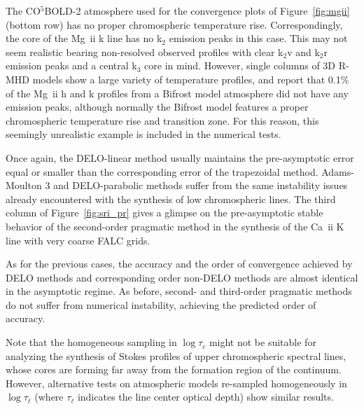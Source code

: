 \documentclass[iop,numberedappendix,twocolappendix,twocolumn]{emulateapj}
\begin{document}
The CO$^5$BOLD-2 atmosphere used for the convergence plots of Figure~\ref{fig:mgii} (bottom row) has
no proper chromospheric temperature rise. Correspondingly, the core of the Mg~{\sc ii} k
line has no k$_2$ emission peaks in this case. This may not seem realistic bearing
non-resolved observed profiles with clear k$_2$v and k$_2$r emission peaks and a
central k$_3$ core in mind. However, single columns of 3D R-MHD models
show a large variety of temperature profiles, and \citet{leenaarts2013b} report
that 0.1\% of the Mg~{\sc ii} h and k profiles from a Bifrost model atmosphere did not have
any emission peaks, although normally the Bifrost model features a proper chromospheric
temperature rise and transition zone. For this reason, this seemingly unrealistic example is included in the numerical tests.

Once again, the DELO-linear method usually maintains  the pre-asymptotic error equal or smaller than
the corresponding error of the trapezoidal method.
Adams-Moulton 3 and DELO-parabolic methods suffer from the same instability issues already encountered with the synthesis of low chromospheric lines. 
The third column of Figure~\ref{fig:sri_pr} gives a glimpse on the pre-asymptotic stable behavior of the second-order pragmatic method in
the synthesis of the Ca~{\sc ii} K line with very coarse FALC grids.

As for the previous cases, the accuracy and the order of convergence achieved by DELO methods
and corresponding order non-DELO methods are almost identical in the asymptotic regime.
As before, second- and third-order pragmatic methods do not suffer from numerical instability, achieving the predicted order of accuracy.

Note that the homogeneous sampling in $\log \tau_c$ might not be suitable for analyzing the synthesis of Stokes profiles of upper chromospheric spectral lines,
whose cores are forming far away from the formation region of the continuum.
However, alternative tests on atmospheric models re-sampled homogeneously in $\log\tau_\ell$ (where $\tau_\ell$ indicates the line center optical depth) show similar results.
%
\end{document}
